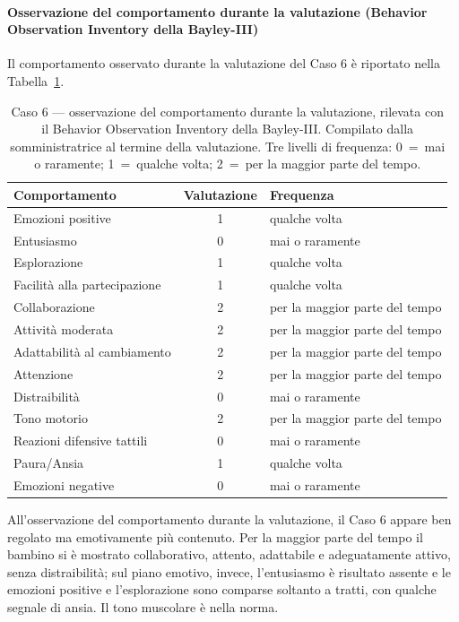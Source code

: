  \paragraph*{Osservazione del comportamento durante la valutazione (Behavior Observation Inventory della Bayley-III)}

Il comportamento osservato durante la valutazione del Caso 6 è riportato nella Tabella~\ref{tab:caso6_boi}.

\begin{table}[htbp]
\centering
\caption[Caso 6 --- osservazione del comportamento durante la valutazione]{Caso 6 --- osservazione del comportamento durante la valutazione, rilevata con il Behavior Observation Inventory della Bayley-III. Compilato dalla somministratrice al termine della valutazione. Tre livelli di frequenza: 0~=~mai o raramente; 1~=~qualche volta; 2~=~per la maggior parte del tempo.}
\label{tab:caso6_boi}
\begin{tabular}{|l|c|l|}
\toprule
\textbf{Comportamento} & \textbf{Valutazione} & \textbf{Frequenza} \\
\midrule
Emozioni positive & 1 & qualche volta \\
Entusiasmo & 0 & mai o raramente \\
Esplorazione & 1 & qualche volta \\
Facilità alla partecipazione & 1 & qualche volta \\
Collaborazione & 2 & per la maggior parte del tempo \\
Attività moderata & 2 & per la maggior parte del tempo \\
Adattabilità al cambiamento & 2 & per la maggior parte del tempo \\
Attenzione & 2 & per la maggior parte del tempo \\
Distraibilità & 0 & mai o raramente \\
Tono motorio & 2 & per la maggior parte del tempo \\
Reazioni difensive tattili & 0 & mai o raramente \\
Paura/Ansia & 1 & qualche volta \\
Emozioni negative & 0 & mai o raramente \\
\bottomrule
\end{tabular}
\end{table}

All'osservazione del comportamento durante la valutazione, il Caso 6 appare ben regolato ma emotivamente più contenuto. Per la maggior parte del tempo il bambino si è mostrato collaborativo, attento, adattabile e adeguatamente attivo, senza distraibilità; sul piano emotivo, invece, l'entusiasmo è risultato assente e le emozioni positive e l'esplorazione sono comparse soltanto a tratti, con qualche segnale di ansia. Il tono muscolare è nella norma.

